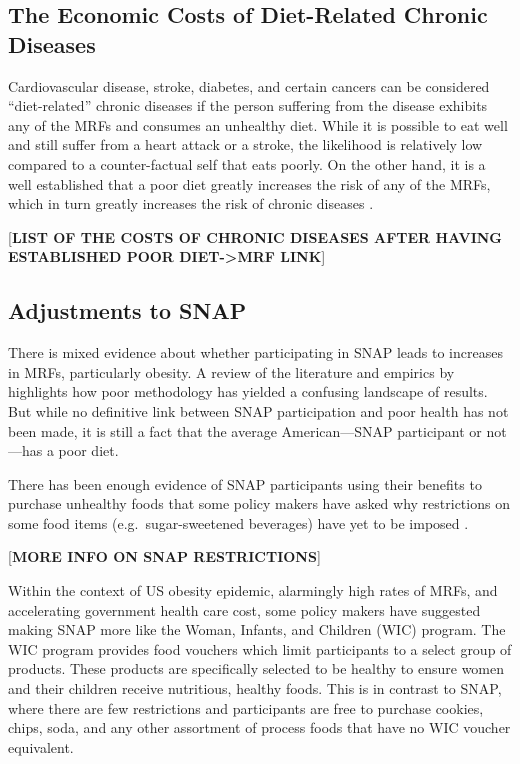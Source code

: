\documentclass[11pt,letterpaper,]{book}
\begin{document}
\subsection{The Economic Costs of Diet-Related Chronic
Diseases}\label{the-economic-costs-of-diet-related-chronic-diseases}

Cardiovascular disease, stroke, diabetes, and certain cancers can be
considered ``diet-related'' chronic diseases if the person suffering
from the disease exhibits any of the MRFs and consumes an unhealthy
diet. While it is possible to eat well and still suffer from a heart
attack or a stroke, the likelihood is relatively low compared to a
counter-factual self that eats poorly. On the other hand, it is a well
established that a poor diet greatly increases the risk of any of the
MRFs, which in turn greatly increases the risk of chronic diseases
\citep{burke_gl_impact_2008}.

{[}\textbf{LIST OF THE COSTS OF CHRONIC DISEASES AFTER HAVING
ESTABLISHED POOR DIET-\textgreater{}MRF LINK}{]}

\subsection{Adjustments to SNAP}\label{adjustments-to-snap}

There is mixed evidence about whether participating in SNAP leads to
increases in MRFs, particularly obesity. A review of the literature and
empirics by \citet{meyerhoefer_relationship_2011} highlights how poor
methodology has yielded a confusing landscape of results. But while no
definitive link between SNAP participation and poor health has not been
made, it is still a fact that the average American---SNAP participant or
not---has a poor diet.

There has been enough evidence of SNAP participants using their benefits
to purchase unhealthy foods that some policy makers have asked why
restrictions on some food items (e.g.~sugar-sweetened beverages) have
yet to be imposed \citep{barnhill_impact_2011}.

{[}\textbf{MORE INFO ON SNAP RESTRICTIONS}{]}

Within the context of US obesity epidemic, alarmingly high rates of
MRFs, and accelerating government health care cost, some policy makers
have suggested making SNAP more like the Woman, Infants, and Children
(WIC) program. The WIC program provides food vouchers which limit
participants to a select group of products. These products are
specifically selected to be healthy to ensure women and their children
receive nutritious, healthy foods. This is in contrast to SNAP, where
there are few restrictions and participants are free to purchase
cookies, chips, soda, and any other assortment of process foods that
have no WIC voucher equivalent.
\end{document}
